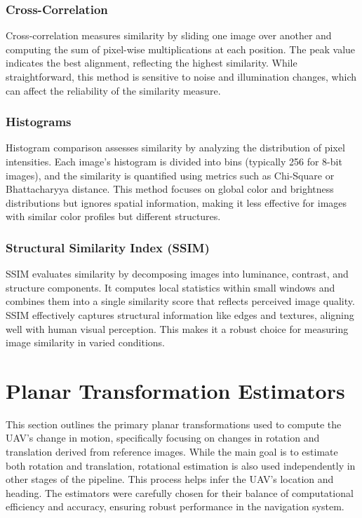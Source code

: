 \subsubsection{Cross-Correlation}

Cross-correlation measures similarity by sliding one image over another and computing the sum of pixel-wise multiplications at each position. The peak value indicates the best alignment, reflecting the highest similarity. While straightforward, this method is sensitive to noise and illumination changes, which can affect the reliability of the similarity measure.

\subsubsection{Histograms}

Histogram comparison assesses similarity by analyzing the distribution of pixel intensities. Each image's histogram is divided into bins (typically 256 for 8-bit images), and the similarity is quantified using metrics such as Chi-Square or Bhattacharyya distance. This method focuses on global color and brightness distributions but ignores spatial information, making it less effective for images with similar color profiles but different structures.

\subsubsection{Structural Similarity Index (SSIM)}

SSIM evaluates similarity by decomposing images into luminance, contrast, and structure components. It computes local statistics within small windows and combines them into a single similarity score that reflects perceived image quality. SSIM effectively captures structural information like edges and textures, aligning well with human visual perception. This makes it a robust choice for measuring image similarity in varied conditions.





\section*{Planar Transformation Estimators}

This section outlines the primary planar transformations used to compute the UAV's change in motion, specifically focusing on changes in rotation and translation derived from reference images. While the main goal is to estimate both rotation and translation, rotational estimation is also used independently in other stages of the pipeline. This process helps infer the UAV's location and heading. The estimators were carefully chosen for their balance of computational efficiency and accuracy, ensuring robust performance in the navigation system.

